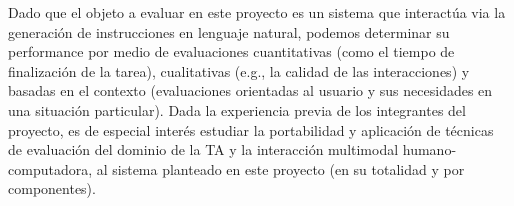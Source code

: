 Dado que el objeto a evaluar en este proyecto es un sistema que interact\'ua
via la generaci\'on de instrucciones en lenguaje natural, podemos
determinar su performance por medio de evaluaciones cuantitativas (como el
tiempo de finalizaci\'on de la tarea), cualitativas (e.g., la calidad de
las interacciones) y basadas en el contexto (evaluaciones orientadas al usuario
y sus necesidades en una situaci\'on particular). Dada la experiencia previa de los
integrantes del proyecto, es de especial inter\'es estudiar la  portabilidad y aplicaci\'on
de t\'ecnicas de evaluaci\'on del dominio de la TA y la interacci\'on multimodal
humano-computadora, al sistema  planteado en
este proyecto (en su totalidad y por componentes).

